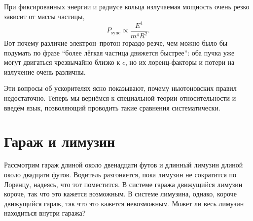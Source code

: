 \begin{classroomqa}
\end{classroomqa}

При фиксированных энергии и радиусе кольца излучаемая мощность очень резко зависит от массы частицы,
\begin{equation}
P_{\mathrm{sync}}\propto \frac{E^4}{m^4R^2}.
\end{equation}
Вот почему различие электрон--протон гораздо резче, чем можно было бы подумать по фразе ``более лёгкая частица движется быстрее'': оба пучка уже могут двигаться чрезвычайно близко к \(c\), но их лоренц-факторы и потери на излучение очень различны.

\begin{classroomqa}
\end{classroomqa}

Эти вопросы об ускорителях ясно показывают, почему ньютоновских правил недостаточно. Теперь мы вернёмся к специальной теории относительности и введём язык, позволяющий проводить такие сравнения систематически.

\section{Гараж и лимузин}

Рассмотрим гараж длиной около двенадцати футов и длинный лимузин длиной около двадцати футов. Водитель разгоняется, пока лимузин не сократится по Лоренцу, надеясь, что тот поместится. В системе гаража движущийся лимузин короче, так что это кажется возможным. В системе лимузина, однако, короче движущийся гараж, так что это кажется невозможным. Может ли весь лимузин находиться внутри гаража?

